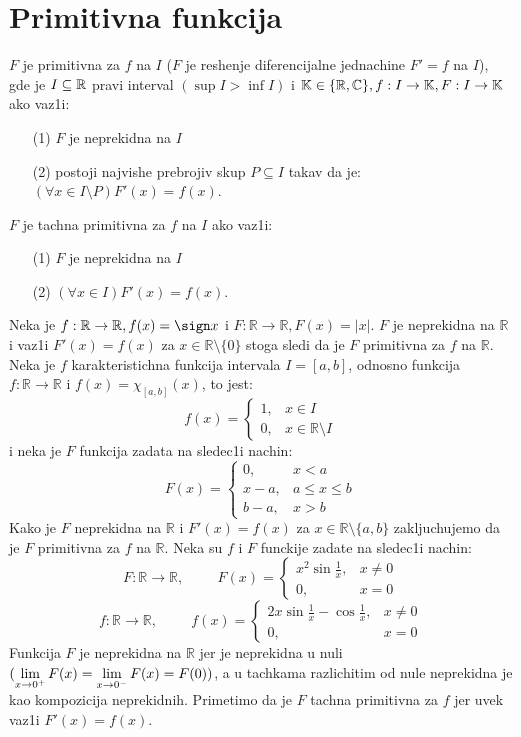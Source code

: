 \documentclass[../main_og.tex]{subfiles}
\begin{document}
\section{Primitivna funkcija}

{\de $F$ je primitivna za $f$ na $I$ ($F$ je reshenje diferencijalne jednachine $F'=f$ na $I$), gde je $I \subseteq \mathbb{R}$ pravi interval $(\sup I > \inf I)$ i $\mathbb{K} \in\{\mathbb{R}, \mathbb{C}\}, f:I\to \mathbb{K}, F:I\to \mathbb{K} $ ako vaz1i:
 \begin{itemize}
        \item[(1)] $F$ je neprekidna na $I$
        \item[(2)] postoji najvishe prebrojiv skup $P\subseteq I$ takav da je: $(\forall x \in I\setminus P) F'(x)=f(x)$.
\end{itemize} 
$F$ je tachna primitivna za $f$ na $I$ ako vaz1i:
\begin{itemize}
        \item[(1)] $F$ je neprekidna na $I$
        \item[(2)] $(\forall x \in I) F'(x)=f(x)$.
\end{itemize}
}
{\pr Neka je $f:\mathbb{R}\to \mathbb{R}, f(x)= \sign x$ i $F:\mathbb{R}\to \mathbb{R}, F(x)= |x|$. $F$ je neprekidna na $\mathbb{R}$ i vaz1i $F'(x)=f(x)$ za $x \in \mathbb{R}\setminus \{0\}$ stoga sledi da je $F$ primitivna za $f$ na $\mathbb{R}$}.
{\pr Neka je $f$ karakteristichna funkcija intervala $I=[a,b]$, odnosno funkcija $f:\mathbb{R}\to \mathbb{R}$ i $f(x)=\chi_{[a,b]}(x)$, to jest: $$
f(x)=\begin{cases}
			1, & x\in I\\
            0, & x\in \mathbb{R}\setminus I
		 \end{cases}$$
i neka je $F$ funkcija zadata na sledec1i nachin:
$$F(x)=\begin{cases}
			0, & x<a\\
            x-a, & a\leqslant x \leqslant b\\
            b-a, & x>b
		 \end{cases}$$
Kako je $F$ neprekidna na $\mathbb{R}$ i $F'(x)=f(x)$ za $x\in\mathbb{R}\setminus\{a,b\}$ zakljuchujemo da je $F$ primitivna za $f$ na $\mathbb{R}$.}
{\pr Neka su $f$ i $F$ funckije zadate na sledec1i nachin:
$$F:\mathbb{R}\to \mathbb{R},\hspace{1cm} F(x)=\begin{cases}
			x^2 \sin \frac{1}{x}, & x\ne 0\\
            0, & x=0
		 \end{cases}$$
$$f:\mathbb{R}\to \mathbb{R},\hspace{1cm} f(x)=\begin{cases}
			2x \sin \frac{1}{x} - \cos \frac{1}{x}, & x\ne 0\\
            0, & x=0
		 \end{cases}$$
Funkcija $F$ je neprekidna na $\mathbb{R}$ jer je neprekidna u nuli $\displaystyle{(\lim_{x\to 0^{+}}F(x)=\lim_{x\to 0^{-}}F(x)}=F(0) )$, a u tachkama razlichitim od nule neprekidna je kao kompozicija neprekidnih. Primetimo da je $F$ tachna primitivna za $f$ jer uvek vaz1i $F'(x)=f(x)$}.
\end{document}
